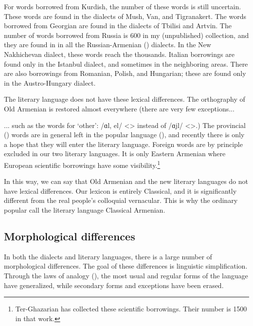 For words borrowed from Kurdish, the number of these words is still uncertain. These words are found in the dialects of Mush, Van, and Tigranakert. The words borrowed from Georgian are found in the dialects of Tbilisi and Artvin. The number of words borrowed from Russia is 600 in my (unpublished) collection, and they are found in in all the Russian-Armenian () dialects. In the New Nakhichevan dialect, these words reach the thousands. Italian borrowings are found only in the Istanbul dialect, and sometimes in the neighboring areas. There are also borrowings from Romanian, Polish, and Hungarian; these are found only in the Austro-Hungary dialect. 

The literary language does not have these lexical differences. The orthography of Old Armenian is restored almost everywhere (there are very few exceptions... 



\begin{adjarianpage}\label{page:20}\end{adjarianpage}%

... such as the words for `other': /ɑl, el/ <> instead of /ɑjl/ <>.) The provincial () words are in general left in the popular language (), and recently there is only a hope that they will enter the literary language. Foreign words are by principle excluded in our two literary languages. It is only Eastern Armenian where European scientific borrowings have some visibility.\footnote{Ter-Ghazarian \citep{DerGhazarian-DictionaryBorrowed} has collected these scientific borrowings. Their number is 1500 in that work.}

In this way, we can say that Old Armenian and the new literary languages do not have lexical differences. Our lexicon is entirely Classical, and it is significantly different from the real people's colloquial vernacular. This is why the ordinary popular call the literary language Classical Armenian. 


\subsection{Morphological differences}
In both the dialects and literary languages, there is a large number of morphological differences. The goal of these differences is linguistic simplification. Through the laws of analogy (), the most usual and regular forms of the language have generalized, while secondary forms and exceptions have been erased.


